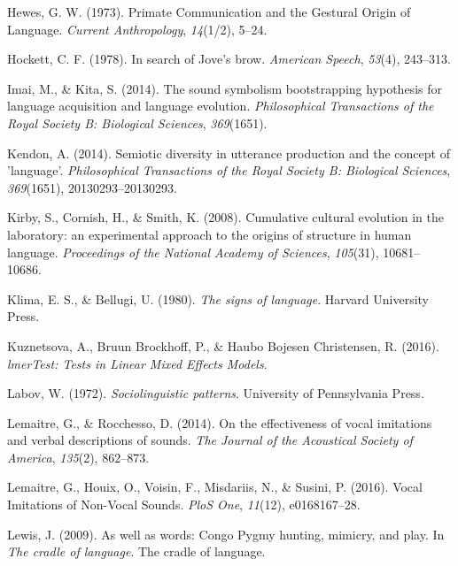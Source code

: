 \documentclass[english,floatsintext,man]{apa6}
\theoremstyle{definition}
\theoremstyle{definition}
\theoremstyle{definition}
\theoremstyle{remark}
\begin{document}
\leavevmode\hypertarget{ref-Hewes:1973vr}{}%
Hewes, G. W. (1973). Primate Communication and the Gestural Origin of
Language. \emph{Current Anthropology}, \emph{14}(1/2), 5--24.

\leavevmode\hypertarget{ref-Hockett:1978se}{}%
Hockett, C. F. (1978). In search of Jove's brow. \emph{American Speech},
\emph{53}(4), 243--313.

\leavevmode\hypertarget{ref-Imai:2014dea}{}%
Imai, M., \& Kita, S. (2014). The sound symbolism bootstrapping
hypothesis for language acquisition and language evolution.
\emph{Philosophical Transactions of the Royal Society B: Biological
Sciences}, \emph{369}(1651).

\leavevmode\hypertarget{ref-Kendon:2014eg}{}%
Kendon, A. (2014). Semiotic diversity in utterance production and the
concept of 'language'. \emph{Philosophical Transactions of the Royal
Society B: Biological Sciences}, \emph{369}(1651), 20130293--20130293.

\leavevmode\hypertarget{ref-Kirby:2008kja}{}%
Kirby, S., Cornish, H., \& Smith, K. (2008). Cumulative cultural
evolution in the laboratory: an experimental approach to the origins of
structure in human language. \emph{Proceedings of the National Academy
of Sciences}, \emph{105}(31), 10681--10686.

\leavevmode\hypertarget{ref-Klima:1980si}{}%
Klima, E. S., \& Bellugi, U. (1980). \emph{The signs of language}.
Harvard University Press.

\leavevmode\hypertarget{ref-lmerTest:2016}{}%
Kuznetsova, A., Bruun Brockhoff, P., \& Haubo Bojesen Christensen, R.
(2016). \emph{lmerTest: Tests in Linear Mixed Effects Models}.

\leavevmode\hypertarget{ref-Labov:1972}{}%
Labov, W. (1972). \emph{Sociolinguistic patterns}. University of
Pennsylvania Press.

\leavevmode\hypertarget{ref-Lemaitre:2014kr}{}%
Lemaitre, G., \& Rocchesso, D. (2014). On the effectiveness of vocal
imitations and verbal descriptions of sounds. \emph{The Journal of the
Acoustical Society of America}, \emph{135}(2), 862--873.

\leavevmode\hypertarget{ref-Lemaitre:2016kz}{}%
Lemaitre, G., Houix, O., Voisin, F., Misdariis, N., \& Susini, P.
(2016). Vocal Imitations of Non-Vocal Sounds. \emph{PloS One},
\emph{11}(12), e0168167--28.

\leavevmode\hypertarget{ref-Lewis:2009wz}{}%
Lewis, J. (2009). As well as words: Congo Pygmy hunting, mimicry, and
play. In \emph{The cradle of language}. The cradle of language.
\end{document}
